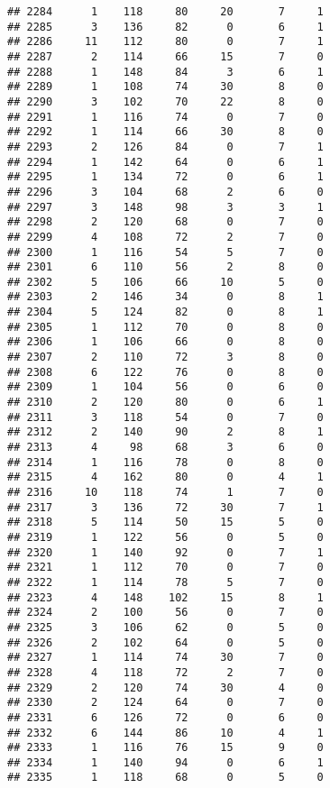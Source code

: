\documentclass[
]{article}
\begin{document}
\begin{verbatim}
## 2284      1    118     80     20       7     1
## 2285      3    136     82      0       6     1
## 2286     11    112     80      0       7     1
## 2287      2    114     66     15       7     0
## 2288      1    148     84      3       6     1
## 2289      1    108     74     30       8     0
## 2290      3    102     70     22       8     0
## 2291      1    116     74      0       7     0
## 2292      1    114     66     30       8     0
## 2293      2    126     84      0       7     1
## 2294      1    142     64      0       6     1
## 2295      1    134     72      0       6     1
## 2296      3    104     68      2       6     0
## 2297      3    148     98      3       3     1
## 2298      2    120     68      0       7     0
## 2299      4    108     72      2       7     0
## 2300      1    116     54      5       7     0
## 2301      6    110     56      2       8     0
## 2302      5    106     66     10       5     0
## 2303      2    146     34      0       8     1
## 2304      5    124     82      0       8     1
## 2305      1    112     70      0       8     0
## 2306      1    106     66      0       8     0
## 2307      2    110     72      3       8     0
## 2308      6    122     76      0       8     0
## 2309      1    104     56      0       6     0
## 2310      2    120     80      0       6     1
## 2311      3    118     54      0       7     0
## 2312      2    140     90      2       8     1
## 2313      4     98     68      3       6     0
## 2314      1    116     78      0       8     0
## 2315      4    162     80      0       4     1
## 2316     10    118     74      1       7     0
## 2317      3    136     72     30       7     1
## 2318      5    114     50     15       5     0
## 2319      1    122     56      0       5     0
## 2320      1    140     92      0       7     1
## 2321      1    112     70      0       7     0
## 2322      1    114     78      5       7     0
## 2323      4    148    102     15       8     1
## 2324      2    100     56      0       7     0
## 2325      3    106     62      0       5     0
## 2326      2    102     64      0       5     0
## 2327      1    114     74     30       7     0
## 2328      4    118     72      2       7     0
## 2329      2    120     74     30       4     0
## 2330      2    124     64      0       7     0
## 2331      6    126     72      0       6     0
## 2332      6    144     86     10       4     1
## 2333      1    116     76     15       9     0
## 2334      1    140     94      0       6     1
## 2335      1    118     68      0       5     0

\end{verbatim}
\end{document}
